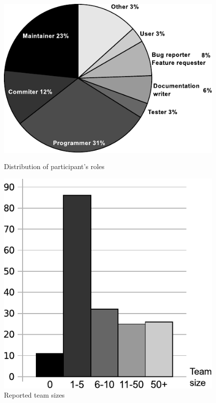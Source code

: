 \documentclass[lnbip]{svmultln}
\begin{document}
\begin{figure}[htb]
  \begin{minipage}[t]{0.5\linewidth}
    \includegraphics[scale=0.8]{floss-roles.pdf}
    \caption{Distribution of participant's roles}
    \label{fig:floss-roles}
  \end{minipage}
  \begin{minipage}[t]{0.5\linewidth}
    \begin{flushright}
      \includegraphics[scale=0.65]{floss-teams.pdf}
      \caption{Reported team sizes}
      \label{fig:floss-teams}
    \end{flushright}
  \end{minipage}
\end{figure}
\end{document}
